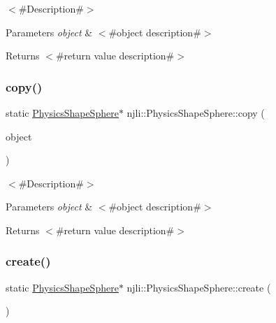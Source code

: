 $<$\#\+Description\#$>$


\begin{DoxyParams}{Parameters}
{\em object} & $<$\#object description\#$>$\\
\hline
\end{DoxyParams}
\begin{DoxyReturn}{Returns}
$<$\#return value description\#$>$ 
\end{DoxyReturn}
\mbox{\label{classnjli_1_1_physics_shape_sphere_a36401d4b67bd40ef1694325cb7ca07aa}} 
\subsubsection{\texorpdfstring{copy()}{copy()}}
{\footnotesize\ttfamily static \mbox{\hyperlink{classnjli_1_1_physics_shape_sphere}{Physics\+Shape\+Sphere}}$\ast$ njli\+::\+Physics\+Shape\+Sphere\+::copy (\begin{DoxyParamCaption}\item[{const \mbox{\hyperlink{classnjli_1_1_physics_shape_sphere}{Physics\+Shape\+Sphere}} \&}]{object }\end{DoxyParamCaption})\hspace{0.3cm}{\ttfamily [static]}}

$<$\#\+Description\#$>$


\begin{DoxyParams}{Parameters}
{\em object} & $<$\#object description\#$>$\\
\hline
\end{DoxyParams}
\begin{DoxyReturn}{Returns}
$<$\#return value description\#$>$ 
\end{DoxyReturn}
\mbox{\label{classnjli_1_1_physics_shape_sphere_a6ba1d3aef468411deee1b0525d5510b5}} 
\subsubsection{\texorpdfstring{create()}{create()}\hspace{0.1cm}{\footnotesize\ttfamily [1/2]}}
{\footnotesize\ttfamily static \mbox{\hyperlink{classnjli_1_1_physics_shape_sphere}{Physics\+Shape\+Sphere}}$\ast$ njli\+::\+Physics\+Shape\+Sphere\+::create (\begin{DoxyParamCaption}{ }\end{DoxyParamCaption})\hspace{0.3cm}{\ttfamily [static]}}

